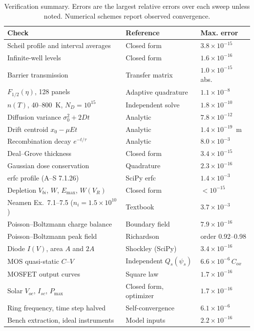 \documentclass[conference]{IEEEtran}
\begin{document}
\begin{table}[t]
\centering
\caption{Verification summary. Errors are the largest relative errors over each sweep unless noted. Numerical schemes report observed convergence.}
\label{tab:verify}
\scriptsize
\setlength{\tabcolsep}{3pt}
\begin{tabular}{@{}l l l@{}}
\toprule
Check & Reference & Max. error \\
\midrule
Scheil profile and interval averages & Closed form & $3.8\times10^{-15}$ \\
Infinite-well levels & Closed form & $1.6\times10^{-16}$ \\
Barrier transmission & Transfer matrix & $1.0\times10^{-15}$ abs. \\
$F_{1/2}(\eta)$, 128 panels & Adaptive quadrature & $1.1\times10^{-8}$ \\
$n(T)$, 40--800~K, $N_D=10^{15}$ & Independent solve & $1.8\times10^{-10}$ \\
Diffusion variance $\sigma_0^2+2Dt$ & Analytic & $7.8\times10^{-12}$ \\
Drift centroid $x_0-\mu Et$ & Analytic & $1.4\times10^{-19}$~m \\
Recombination decay $e^{-t/\tau}$ & Analytic & $8.0\times10^{-3}$ \\
Deal--Grove thickness & Closed form & $3.4\times10^{-15}$ \\
Gaussian dose conservation & Quadrature & $2.3\times10^{-16}$ \\
erfc profile (A--S 7.1.26) & SciPy erfc & $1.4\times10^{-3}$ \\
Depletion $V_{bi}$, $W$, $E_{\max}$, $W(V_R)$ & Closed form & $<10^{-15}$ \\
Neamen Ex.\ 7.1--7.5 ($n_i=1.5\times10^{10}$) & Textbook & $3.7\times10^{-3}$ \\
Poisson--Boltzmann charge balance & Boundary field & $7.9\times10^{-16}$ \\
Poisson--Boltzmann peak field & Richardson & order 0.92--0.98 \\
Diode $I(V)$, area $A$ and $2A$ & Shockley (SciPy) & $3.4\times10^{-16}$ \\
MOS quasi-static $C$--$V$ & Independent $Q_s(\psi_s)$ & $6.6\times10^{-6}\,C_{ox}$ \\
MOSFET output curves & Square law & $1.7\times10^{-16}$ \\
Solar $V_{oc}$, $I_{sc}$, $P_{\max}$ & Closed form, optimizer & $1.7\times10^{-16}$ \\
Ring frequency, time step halved & Self-convergence & $6.1\times10^{-6}$ \\
Bench extraction, ideal instruments & Model inputs & $2.2\times10^{-16}$ \\
\bottomrule
\end{tabular}
\end{table}
\end{document}
